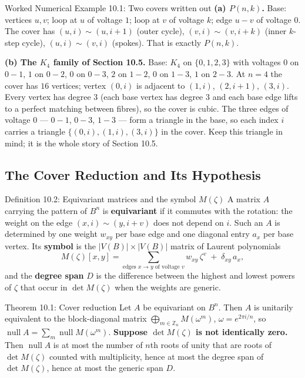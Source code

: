 \documentclass[11pt]{article}
\begin{document}
\begin{callbox}{Worked Numerical Example 10.1: Two covers written out}
\textbf{(a) $P(n,k)$.} Base: vertices $u,v$; loop at $u$ of voltage $1$; loop at $v$ of voltage $k$; edge $u\!-\!v$ of voltage $0$. The cover has $(u,i)\sim(u,i+1)$ (outer cycle), $(v,i)\sim(v,i+k)$ (inner $k$-step cycle), $(u,i)\sim(v,i)$ (spokes). That is exactly $P(n,k)$.

\textbf{(b) The $K_4$ family of Section 10.5.} Base: $K_4$ on $\{0,1,2,3\}$ with voltages $0$ on $0\!-\!1$, $1$ on $0\!-\!2$, $0$ on $0\!-\!3$, $2$ on $1\!-\!2$, $0$ on $1\!-\!3$, $1$ on $2\!-\!3$. At $n=4$ the cover has $16$ vertices; vertex $(0,i)$ is adjacent to $(1,i)$, $(2,i+1)$, $(3,i)$. Every vertex has degree $3$ (each base vertex has degree $3$ and each base edge lifts to a perfect matching between fibres), so the cover is cubic. The three edges of voltage $0$ --- $0\!-\!1$, $0\!-\!3$, $1\!-\!3$ --- form a triangle in the base, so each index $i$ carries a triangle $\{(0,i),(1,i),(3,i)\}$ in the cover. Keep this triangle in mind; it is the whole story of Section 10.5.
\end{callbox}

\subsection{The Cover Reduction and Its Hypothesis}

\begin{defbox}{Definition 10.2: Equivariant matrices and the symbol $M(\zeta)$}
A matrix $A$ carrying the pattern of $B^n$ is \textbf{equivariant} if it commutes with the rotation: the weight on the edge $(x,i)\sim(y,i+v)$ does not depend on $i$. Such an $A$ is determined by one weight $w_{xy}$ per base edge and one diagonal entry $a_x$ per base vertex. Its \textbf{symbol} is the $|V(B)|\times|V(B)|$ matrix of Laurent polynomials
\begin{equation}
  M(\zeta)[x,y]=\sum_{\text{edges }x\to y\text{ of voltage }v} w_{xy}\,\zeta^{v}\;+\;\delta_{xy}\,a_x ,
\end{equation}
and the \textbf{degree span} $D$ is the difference between the highest and lowest powers of $\zeta$ that occur in $\det M(\zeta)$ when the weights are generic.
\end{defbox}

\begin{thmbox}{Theorem 10.1: Cover reduction}
Let $A$ be equivariant on $B^n$. Then $A$ is unitarily equivalent to the block-diagonal matrix $\bigoplus_{m\in\mathbb Z_n}M(\omega^m)$, $\omega=e^{2\pi i/n}$, so $\operatorname{null}A=\sum_m\operatorname{null}M(\omega^m)$. \textbf{Suppose $\det M(\zeta)$ is not identically zero.} Then $\operatorname{null}A$ is at most the number of $n$th roots of unity that are roots of $\det M(\zeta)$ counted with multiplicity, hence at most the degree span of $\det M(\zeta)$, hence at most the generic span $D$.
\end{thmbox}
\end{document}
